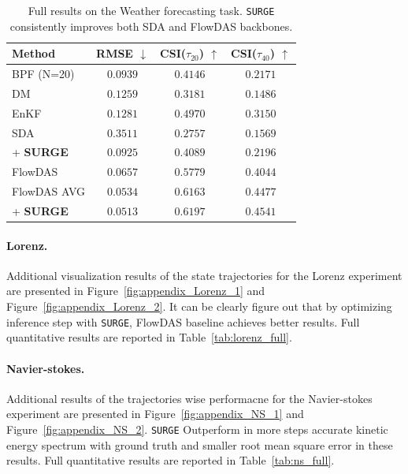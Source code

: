 \documentclass{article}
\theoremstyle{plain}
\theoremstyle{definition}
\theoremstyle{remark}
\begin{document}
\begin{table}[t]
\caption{Full results on the Weather forecasting task. \texttt{SURGE} consistently improves both SDA and FlowDAS backbones.}
\label{tab:weather_full}
\begin{center}
\begin{small}
\begin{sc}
\begin{tabular}{lccc}
\toprule
Method & RMSE $\downarrow$ & CSI($\tau_{20}$) $\uparrow$ & CSI($\tau_{40}$) $\uparrow$ \\
\midrule
BPF (N=20)              & $0.0939$ & $0.4146$ & $0.2171$ \\
DM                      & $0.1259$ & $0.3181$ & $0.1486$ \\
EnKF                    & $0.1281$ & $0.4970$ & $0.3150$ \\
SDA                     & $0.3511$ & $0.2757$ & $0.1569$ \\
\quad + \textbf{SURGE}  & $0.0925$ & $0.4089$ & $0.2196$ \\
FlowDAS                 & $0.0657$ & $0.5779$ & $0.4044$ \\
FlowDAS AVG             & $0.0534$ & $0.6163$ & $0.4477$ \\
\quad + \textbf{SURGE}  & $\mathbf{0.0513}$ & $\mathbf{0.6197}$ & $\mathbf{0.4541}$ \\
\bottomrule
\end{tabular}
\end{sc}
\end{small}
\end{center}
\end{table}


\paragraph{Lorenz.}
Additional visualization results of the state trajectories for the Lorenz experiment are presented in Figure~\ref{fig:appendix_Lorenz_1} and Figure~\ref{fig:appendix_Lorenz_2}. It can be clearly figure out that by optimizing inference step with \texttt{SURGE}, FlowDAS baseline achieves better results. Full quantitative results are reported in Table~\ref{tab:lorenz_full}.

\paragraph{Navier-stokes.} Additional results of the trajectories wise performacne for the Navier-stokes experiment are presented in Figure~\ref{fig:appendix_NS_1} and Figure~\ref{fig:appendix_NS_2}. \texttt{SURGE} Outperform in more steps accurate kinetic energy spectrum with ground truth and smaller root mean square error in these results. Full quantitative results are reported in Table~\ref{tab:ns_full}.
\end{document}
